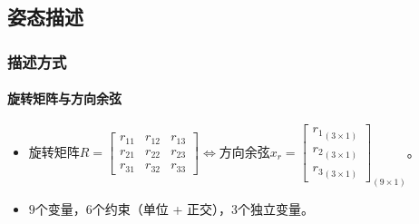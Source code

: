 \documentclass[
12pt, %
a4paper, 
oneside, %
headinclude,footinclude, %
]{scrartcl}
\begin{document}
\subsection[姿态描述]{姿态描述}
\subsubsection[描述方式]{描述方式}
\paragraph{旋转矩阵与方向余弦}
\begin{itemize}
\item 旋转矩阵$ R = \begin{bmatrix} r_{11} & r_{12} & r_{13} \\ r_{21} & r_{22} & r_{23} \\ r_{31} & r_{32} & r_{33} \end{bmatrix} $$ \Leftrightarrow $方向余弦$ x_r = \begin{bmatrix} {r_1}_{(3 \times 1)} \\ {r_2}_{(3 \times 1)} \\ {r_3}_{(3 \times 1)} \end{bmatrix}_{(9 \times 1)} $。
\item $ 9 $个变量，$ 6 $个约束（单位 + 正交），$ 3 $个独立变量。
\end{itemize}
\end{document}
